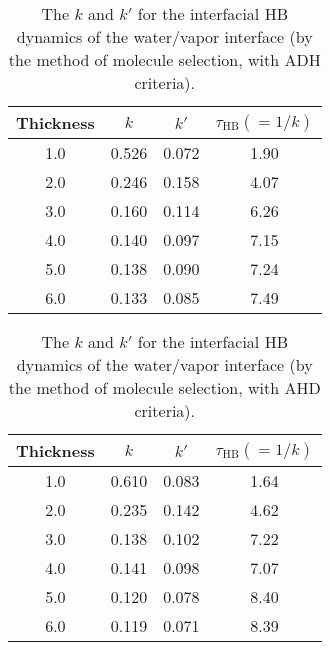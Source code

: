 \begin{table}[H]
\centering
\caption{\label{tab:k_k_prime_tau_128w_pure_ihb_scheme1_ADH} 
    The $k$ and $k'$ for the interfacial HB dynamics of the water/vapor interface (by the method of molecule selection, with ADH criteria).} 
\begin{tabular}{cccc}
 Thickness & $k$ & $k'$ & $\tau_{\text{HB}} (=1/k)$ \\
\hline
  1.0 & 0.526 & 0.072 & 1.90  \\
  2.0 & 0.246 & 0.158 & 4.07  \\
  3.0 & 0.160 & 0.114 & 6.26  \\
  4.0 & 0.140 & 0.097 & 7.15  \\
  5.0 & 0.138 & 0.090 & 7.24  \\
  6.0 & 0.133 & 0.085 & 7.49  \\
\end{tabular}
\end{table}
\begin{table}[H]
\centering
\caption{\label{tab:k_k_prime_tau_128w_pure_ihb_AHD} 
    The $k$ and $k'$ for the interfacial HB dynamics of the water/vapor interface (by the method of molecule selection, with AHD criteria).} 
\begin{tabular}{cccc}
 Thickness & $k$ & $k'$ & $\tau_{\text{HB}} (=1/k)$ \\
\hline
  1.0 & 0.610 & 0.083 & 1.64  \\
  2.0 & 0.235 & 0.142 & 4.62  \\
  3.0 & 0.138 & 0.102 & 7.22  \\
  4.0 & 0.141 & 0.098 & 7.07  \\
  5.0 & 0.120 & 0.078 & 8.40  \\
  6.0 & 0.119 & 0.071 & 8.39  \\
\end{tabular}
\end{table}


